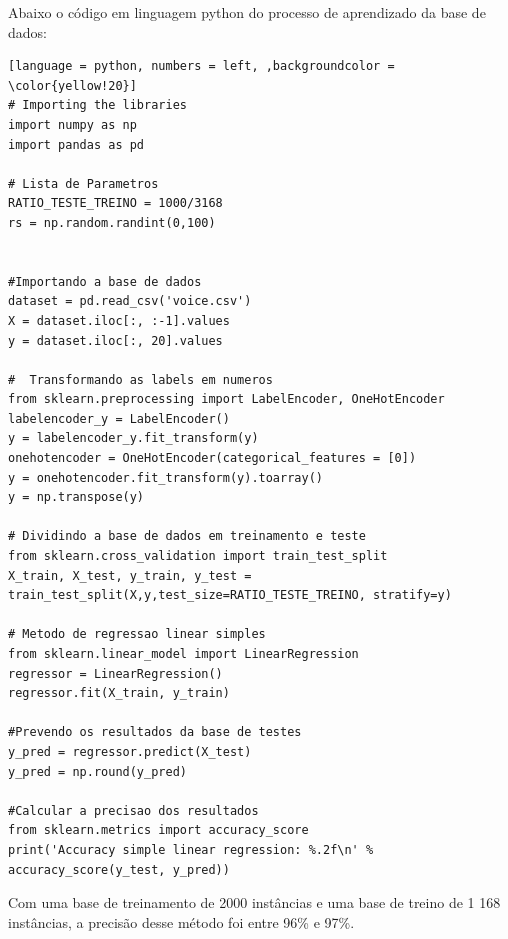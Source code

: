 Abaixo o código em linguagem python do processo de aprendizado da base de dados:
\begin{lstlisting}[language = python, numbers = left, ,backgroundcolor = \color{yellow!20}]
# Importing the libraries
import numpy as np
import pandas as pd

# Lista de Parametros
RATIO_TESTE_TREINO = 1000/3168
rs = np.random.randint(0,100)


#Importando a base de dados
dataset = pd.read_csv('voice.csv')
X = dataset.iloc[:, :-1].values
y = dataset.iloc[:, 20].values

#  Transformando as labels em numeros
from sklearn.preprocessing import LabelEncoder, OneHotEncoder
labelencoder_y = LabelEncoder()
y = labelencoder_y.fit_transform(y)
onehotencoder = OneHotEncoder(categorical_features = [0])
y = onehotencoder.fit_transform(y).toarray()
y = np.transpose(y)

# Dividindo a base de dados em treinamento e teste
from sklearn.cross_validation import train_test_split
X_train, X_test, y_train, y_test = train_test_split(X,y,test_size=RATIO_TESTE_TREINO, stratify=y)

# Metodo de regressao linear simples
from sklearn.linear_model import LinearRegression
regressor = LinearRegression()
regressor.fit(X_train, y_train)

#Prevendo os resultados da base de testes
y_pred = regressor.predict(X_test)
y_pred = np.round(y_pred)

#Calcular a precisao dos resultados
from sklearn.metrics import accuracy_score
print('Accuracy simple linear regression: %.2f\n' % accuracy_score(y_test, y_pred))
\end{lstlisting}  

Com uma base de treinamento de 2000 instâncias e uma base de treino de 1 168 instâncias, a precisão desse método foi entre 96\% e 97\%.